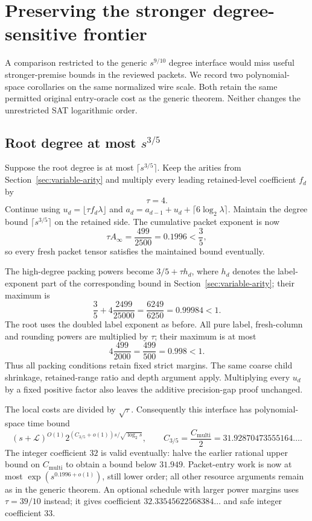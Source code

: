 \section{Preserving the stronger degree-sensitive frontier}
\label{sec:degree-corollaries}

A comparison restricted to the generic $s^{9/10}$ degree interface would
miss useful stronger-premise bounds in the reviewed packets.  We record
two polynomial-space corollaries on the same normalized wire scale.  Both
retain the same permitted original entry-oracle cost as the generic
theorem.  Neither changes the unrestricted SAT logarithmic order.

\subsection{Root degree at most \texorpdfstring{$s^{3/5}$}{s to the power 3/5}}

Suppose the root degree is at most $\lceil s^{3/5}\rceil$.  Keep the
arities from Section~\ref{sec:variable-arity} and multiply every leading
retained-level coefficient $f_d$ by
\[
 \tau=4.
\]
Continue using $u_d=\lfloor\tau f_d\lambda\rfloor$ and
$a_d=a_{d-1}+u_d+\lceil6\log_2\lambda\rceil$.
Maintain the degree bound $\lceil s^{3/5}\rceil$ on the retained side.
The cumulative packet exponent is now
\[
 \tau A_\infty=\frac{499}{2500}=0.1996<\frac35,
\]
so every fresh packet tensor satisfies the maintained bound eventually.

The high-degree packing powers become $3/5+\tau h_d$, where
$h_d$ denotes the label-exponent part of the corresponding bound in
Section~\ref{sec:variable-arity}; their maximum is
\[
 \frac35+4\frac{2499}{25000}
 =\frac{6249}{6250}=0.99984<1.
\]
The root uses the doubled label exponent as before.  All pure label,
fresh-column and rounding powers are multiplied by $\tau$; their maximum
is at most
\[
 4\frac{499}{2000}
 =\frac{499}{500}=0.998<1.
\]
Thus all packing conditions retain fixed strict margins.  The same
coarse child shrinkage, retained-range ratio and depth argument apply.
Multiplying every $u_d$ by a fixed positive factor also leaves the
additive precision-gap proof unchanged.

The local costs are divided by $\sqrt\tau$.  Consequently this interface
has polynomial-space time bound
\[
 (s+\mathcal L)^{O(1)}
 2^{(C_{3/5}+o(1))s/\sqrt{\log_2s}},\qquad
 C_{3/5}=\frac{C_{\mathrm{multi}}}{2}
 =31.92870473555164\ldots.
\]
The integer coefficient $32$ is valid eventually: halve the earlier
rational upper bound on $C_{\mathrm{multi}}$ to obtain a bound below
$31.949$.  Packet-entry work is now at most
$\exp(s^{0.1996+o(1)})$, still lower order; all other resource arguments
remain as in the generic theorem.  An optional schedule with larger
power margins uses $\tau=39/10$ instead; it gives coefficient
$32.33545622568384\ldots$ and safe integer coefficient $33$.

